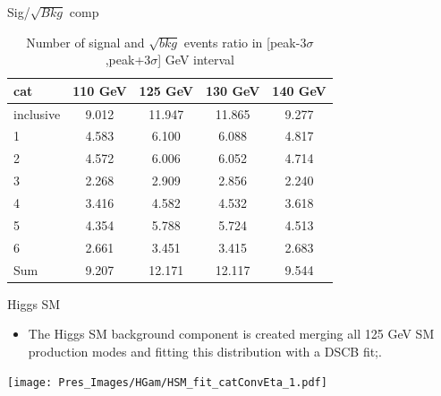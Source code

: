 \documentclass[10pt,UKenglish, leqno, xcolor = dvipsnames]{beamer}
\begin{document}
	\begin{frame}{Sig/$\sqrt{Bkg}$ comp}
		\vfill
		\begin{table}[tbp]
			\centering
			\begin{tabular}{lcccc}
				\toprule[1.5pt]
				cat & 110 GeV	& 125 GeV	& 130 GeV	& 140 GeV	\\
				\midrule
				inclusive & 9.012 & 11.947 & 11.865 & 9.277 	\\ 
				1 & 4.583 & 6.100 & 6.088 & 4.817 	\\
				2 & 4.572 & 6.006 & 6.052 & 4.714 	\\
				3 & 2.268 & 2.909 & 2.856 & 2.240 	\\
				4 & 3.416 & 4.582 & 4.532 & 3.618 	\\
				5 & 4.354 & 5.788 & 5.724 & 4.513 	\\
				6 & 2.661 & 3.451 & 3.415 & 2.683 	\\
				Sum & 9.207 & 12.171 & 12.117 & 9.544	\\
				\bottomrule[1.5pt]
			\end{tabular}
			\caption{Number of signal and $\sqrt{bkg}$ events ratio in [peak-3$\sigma$,peak+3$\sigma$] GeV interval}
		\end{table}
		\vfill
	\end{frame}

	\begin{frame}{Higgs SM}
		\vfill
		\begin{itemize}
			\item The Higgs SM background component is created merging all 125 GeV SM production modes and fitting this distribution with a DSCB fit;.
		\end{itemize}
		\begin{center}
			\texttt{[image: Pres\_Images/HGam/HSM\_fit\_catConvEta\_1.pdf]}
		\end{center}
		\vfill
	\end{frame}
	
\end{document}
